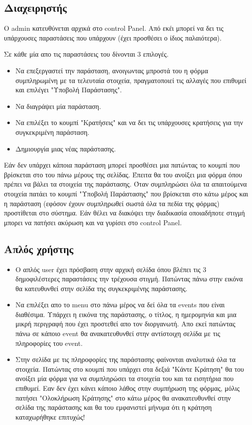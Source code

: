\documentclass{acmart}
\begin{document}
\subsection{Διαχειρηστής}
Ο admin κατευθύνεται αρχικά στο control Panel. Από εκέι μπορεί να δει τις υπάρχουσες παραστάσεις που υπάρχουν (έχει προσθέσει ο ίδιος παλαιότερα).

Σε κάθε μία απο τις παραστάσεις του δίνονται 3 επιλογές.
\begin{itemize}
\item Να επεξεργαστεί την παράσταση, ανοιγωντας μπροστά του η φόρμα συμπληρωμένη με τα τελευταία στοιχεία, πραγματοποιεί τις αλλαγές που επιθυμεί και επιλέγει "Υποβολή Παράστασης".

\item Να διαγράψει μία παράσταση.

\item Να επιλέξει το κουμπί "Κρατήσεις" και να δει τις υπάρχουσες κρατήσεις για την συγκεκριμένη παράσταση.

\item Δημιουργία μιας νέας παράστασης.
\end{itemize}

Εάν δεν υπάρχει κάποια παράσταση μπορεί προσθέσει μια πατώντας το κουμπί που βρίσκεται στο του πάνω μέρους της σελίδας. Έπειτα θα του ανοίξει μια φόρμα όπου πρέπει να βάλει τα στοιχεία της παράστασης. Όταν συμπληρώσει όλα τα απαιτούμενα στοιχεία πατάει το κουμπί "Υποβολή Παράστασης" που βρίσκεται στο κάτω μέρος και η παράσταση (εφόσον έχουν συμπληρωθεί σωστά όλα τα πεδία της φόρμας) προστίθεται στο σύστημα. Εάν θέλει να διακόψει την διαδικασία οποιαδήποτε στιγμή μπορει να πατήσει ακύρωση και να γυρίσει στο control Panel.

\subsection{Απλός χρήστης}

\begin{itemize}

\item Ο απλός user έχει πρόσβαση στην αρχική σελίδα όπου βλέπει τις 3 δημοφιλέστερες παραστάσεις την τρέχουσα στιγμή. Πατώντας πάνω στην εικόνα θα κατευθυνθεί στην σελίδα της συγκεκριμένης παράστασης.

\item Να επιλέξει απο το menu στο πάνω μέρος να δεί όλα τα events που είναι διαθέσιμα. Υπάρχει η εικόνα της παράστασης, ο τίτλος, η ημερομηνία και μια μικρή περιγραφή που έχει προστεθεί απο τον διοργανωτή. Απο εκεί πατώντας πάνω σε κάποιο event θα ανακατευθυνθεί στην αντίστοιχη σελίδα με τις πληροφορίες του event.

\item Στην σελίδα με τις πληροφορίες της παράστασης φαίνονται αναλυτικά όλα τα στοιχεία. Πατώντας στο κουμπί που υπάρχει στα δεξιά "Κάντε Κράτηση" θα του ανοίξει μία φόρμα για να συμπληρώσει τα στοιχεία του και τα εισητήρια που επιθυμεί. Εαν δεν έχει κάνει κάποιο λάθος στην συμπήρωση της φόρμας, μόλις πατήσει "Ολοκλήρωση Κράτησης" στο κάτω μέρος θα ανακατευθυνθεί στην σελίδα της παράστασης και θα του εμφανιστεί μήνυμα ότι η κράτηση καταχωρήθηκε επιτυχώς!
\end{itemize}
\end{document}
